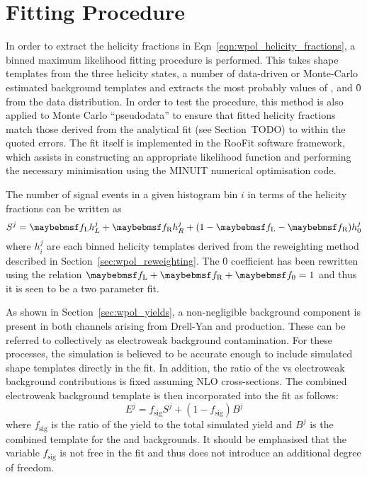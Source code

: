 


\section{Fitting Procedure}
\label{sec:wpol_fitting}
In order to extract the helicity fractions in
Eqn~\ref{eqn:wpol_helicity_fractions}, a binned maximum likelihood fitting
procedure is performed. This takes \LP shape templates from the three \PW
helicity states, a number of data-driven or Monte-Carlo estimated background
templates and extracts the most probably values of \fL, \fR and \f0 from the
data distribution. In order to test the procedure, this method is also applied
to Monte Carlo ``pseudodata'' to ensure that fitted helicity fractions match
those derived from the analytical fit (see Section~TODO) to within the quoted
errors. The fit itself is implemented in the \ac{RooFit} software framework,
which assists in constructing an appropriate likelihood function and performing
the necessary minimisation using the \ac{MINUIT} numerical optimisation code.

The number of signal events in a given histogram bin $i$ in terms of the
helicity fractions can be written as
\begin{equation}
S^j = \fL h_L^j + \fR h_R^j + (1-\fL-\fR)h_0^j
\end{equation}
where $h_i^j$ are each binned helicity templates derived from the reweighting
method described in Section~\ref{sec:wpol_reweighting}. The \f0
coefficient has been rewritten using the relation $\fL + \fR +\f0 = 1$ and thus
it is seen to be a two parameter fit.

As shown in Section~\ref{sec:wpol_yields}, a non-negligible background component
is present in both channels arising from Drell-Yan and \ttbar production. These
can be referred to collectively as electroweak background contamination. For
these processes, the simulation is believed to be accurate enough to include
simulated \LP shape templates directly in the fit. In addition, the ratio of the
\Wjets vs electroweak background contributions is fixed assuming \ac{NLO}
cross-sections. The combined electroweak background template is then
incorporated into the fit as follows:
\begin{equation}
E^j = f_{\textrm{sig}} S^j + (1-f_{\textrm{sig}}) B^j
\end{equation}
where $f_{\textrm{sig}}$ is the ratio of the \Wjets yield to the total simulated
yield and $B^j$ is the combined \LP template for the \Zjets and \ttbar
backgrounds. It should be emphasised that the variable $f_{\textrm{sig}}$ is not
free in the fit and thus does not introduce an additional degree of freedom.

